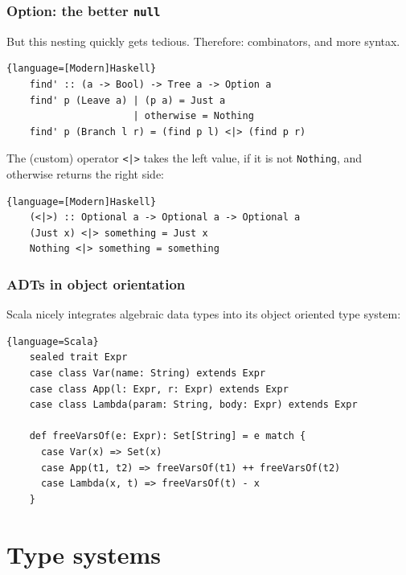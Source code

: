 \documentclass{beamer}
\begin{document}
\begin{frame}[containsverbatim]
  \frametitle{Option: the better \texttt{null}} 

  But this nesting quickly gets tedious. Therefore: combinators, and more syntax.

  \begin{lstlisting}{language=[Modern]Haskell}
    find' :: (a -> Bool) -> Tree a -> Option a
    find' p (Leave a) | (p a) = Just a
                      | otherwise = Nothing
    find' p (Branch l r) = (find p l) <|> (find p r)
  \end{lstlisting}

  The (custom) operator \lstinline$<|>$ takes the left value, if it is not \lstinline|Nothing|, and
  otherwise returns the right side:

    \begin{lstlisting}{language=[Modern]Haskell}
    (<|>) :: Optional a -> Optional a -> Optional a
    (Just x) <|> something = Just x
    Nothing <|> something = something
  \end{lstlisting}
\end{frame}

\begin{frame}[containsverbatim]
  \frametitle{ADTs in object orientation} 

  Scala nicely integrates algebraic data types into its object oriented type system:

  \begin{lstlisting}{language=Scala}
    sealed trait Expr
    case class Var(name: String) extends Expr
    case class App(l: Expr, r: Expr) extends Expr
    case class Lambda(param: String, body: Expr) extends Expr

    def freeVarsOf(e: Expr): Set[String] = e match {
      case Var(x) => Set(x)
      case App(t1, t2) => freeVarsOf(t1) ++ freeVarsOf(t2)
      case Lambda(x, t) => freeVarsOf(t) - x
    }
  \end{lstlisting}
\end{frame}


\section{Type systems}
\end{document}
